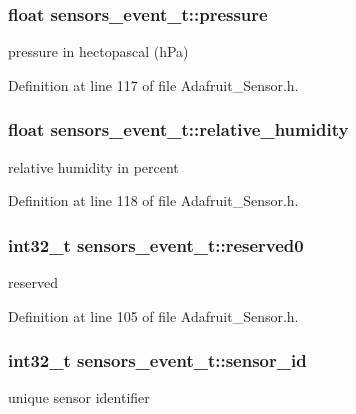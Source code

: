\subsubsection[{\texorpdfstring{pressure}{pressure}}]{\setlength{\rightskip}{0pt plus 5cm}float sensors\+\_\+event\+\_\+t\+::pressure}\hypertarget{structsensors__event__t_a2ec6e34e1a6cf832d85ca19066bd38f0}{}\label{structsensors__event__t_a2ec6e34e1a6cf832d85ca19066bd38f0}
pressure in hectopascal (h\+Pa) 

Definition at line 117 of file Adafruit\+\_\+\+Sensor.\+h.

\subsubsection[{\texorpdfstring{relative\+\_\+humidity}{relative\_humidity}}]{\setlength{\rightskip}{0pt plus 5cm}float sensors\+\_\+event\+\_\+t\+::relative\+\_\+humidity}\hypertarget{structsensors__event__t_a577b73698368fb061382ce9f31052417}{}\label{structsensors__event__t_a577b73698368fb061382ce9f31052417}
relative humidity in percent 

Definition at line 118 of file Adafruit\+\_\+\+Sensor.\+h.

\subsubsection[{\texorpdfstring{reserved0}{reserved0}}]{\setlength{\rightskip}{0pt plus 5cm}int32\+\_\+t sensors\+\_\+event\+\_\+t\+::reserved0}\hypertarget{structsensors__event__t_a8be4dc00344f46abf29e06251bf9fad9}{}\label{structsensors__event__t_a8be4dc00344f46abf29e06251bf9fad9}
reserved 

Definition at line 105 of file Adafruit\+\_\+\+Sensor.\+h.

\subsubsection[{\texorpdfstring{sensor\+\_\+id}{sensor\_id}}]{\setlength{\rightskip}{0pt plus 5cm}int32\+\_\+t sensors\+\_\+event\+\_\+t\+::sensor\+\_\+id}\hypertarget{structsensors__event__t_a6b06d35b17afbee79de7f45d9d71ed0b}{}\label{structsensors__event__t_a6b06d35b17afbee79de7f45d9d71ed0b}
unique sensor identifier 

